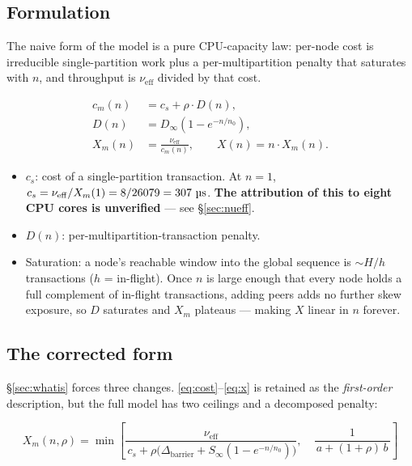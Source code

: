 \documentclass[11pt,a4paper]{article}
\newcommand{\tput}{\ensuremath{X}}
\newcommand{\pernode}{X_m}
\newcommand{\msecs}{\ensuremath{\,\text{\textmu}\text{s}}}
\newcommand{\nueff}{\ensuremath{\nu_{\mathrm{eff}}}}
\begin{document}
\subsection{Formulation}

The naive form of the model is a pure CPU-capacity law: per-node cost is
irreducible single-partition work plus a per-multipartition penalty that
saturates with $n$, and throughput is $\nueff$ divided by that cost.

\begin{align}
c_m(n) &= c_s + \rho \cdot D(n), \label{eq:cost}\\
D(n) &= D_\infty\left(1 - e^{-n/n_0}\right), \label{eq:sat}\\
\pernode(n) &= \frac{\nueff}{c_m(n)}, \qquad
\tput(n) = n\cdot\pernode(n). \label{eq:x}
\end{align}

\begin{itemize}[leftmargin=1.2em,itemsep=2pt]
\item $c_s$: cost of a single-partition transaction. At $n=1$,
      $c_s = \nueff/\pernode(1) = 8/26079 = \SI{307}{\msecs}$.
      \textbf{The attribution of this to eight CPU cores is unverified} ---
      see \S\ref{sec:nueff}.
\item $D(n)$: per-multipartition-transaction penalty.
\item Saturation: a node's reachable window into the global sequence is
      $\sim H/h$ transactions ($h$ = in-flight). Once $n$ is large enough that
      every node holds a full complement of in-flight transactions, adding
      peers adds no further skew exposure, so $D$ saturates and $\pernode$
      plateaus --- making $\tput$ linear in $n$ forever.
\end{itemize}

\subsection{The corrected form}

\S\ref{sec:whatis} forces three changes. \eqref{eq:cost}--\eqref{eq:x} is
retained as the \emph{first-order} description, but the full model has two
ceilings and a decomposed penalty:

\begin{equation}
\boxed{\;
\pernode(n,\rho) = \min\!\left[
\frac{\nueff}{\,c_s+\rho\big(\Delta_{\mathrm{barrier}}
                            + S_\infty(1-e^{-n/n_0})\big)},
\quad
\frac{1}{\,a+(1+\rho)\,b\,}
\right] \;}
\label{eq:corrected}
\end{equation}
\end{document}
